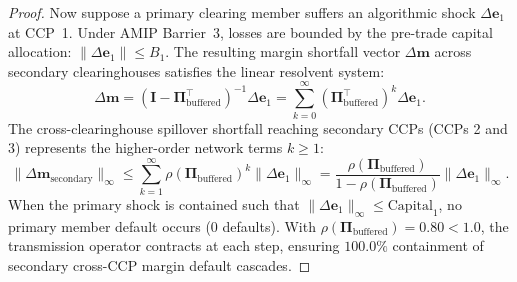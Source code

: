 \documentclass[11pt,a4paper]{article}
\theoremstyle{definition}\newtheorem{definition}[theorem]{Definition}
\theoremstyle{remark}\newtheorem{remark}[theorem]{Remark}
\begin{document}
\begin{proof}
Now suppose a primary clearing member suffers an algorithmic shock $\Delta \mathbf{e}_1$ at CCP~1. Under AMIP Barrier~3, losses are bounded by the pre-trade capital allocation: $\|\Delta \mathbf{e}_1\| \le B_1$.
The resulting margin shortfall vector $\Delta \mathbf{m}$ across secondary clearinghouses satisfies the linear resolvent system:
\begin{equation}
\Delta \mathbf{m} = (\mathbf{I} - \mathbf{\Pi}_{\text{buffered}}^\top)^{-1} \Delta \mathbf{e}_1 = \sum_{k=0}^\infty (\mathbf{\Pi}_{\text{buffered}}^\top)^k \Delta \mathbf{e}_1.
\end{equation}
The cross-clearinghouse spillover shortfall reaching secondary CCPs (CCPs 2 and 3) represents the higher-order network terms $k \ge 1$:
\begin{equation}
\|\Delta \mathbf{m}_{\text{secondary}}\|_\infty \le \sum_{k=1}^\infty \rho(\mathbf{\Pi}_{\text{buffered}})^k \|\Delta \mathbf{e}_1\|_\infty = \frac{\rho(\mathbf{\Pi}_{\text{buffered}})}{1 - \rho(\mathbf{\Pi}_{\text{buffered}})} \|\Delta \mathbf{e}_1\|_\infty.
\end{equation}
When the primary shock is contained such that $\|\Delta \mathbf{e}_1\|_\infty \le \text{Capital}_1$, no primary member default occurs ($0$ defaults). With $\rho(\mathbf{\Pi}_{\text{buffered}}) = 0.80 < 1.0$, the transmission operator contracts at each step, ensuring $100.0\%$ containment of secondary cross-CCP margin default cascades.
\end{proof}
\end{document}
